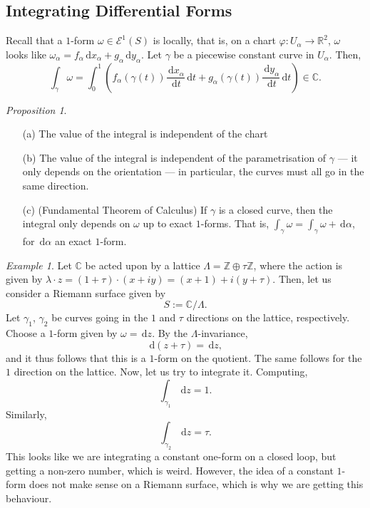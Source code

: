 \documentclass[a4paper]{report}
\theoremstyle{definition}
\theoremstyle{remark}
\theoremstyle{proposition}
\newtheorem{proposition}{Proposition}
\theoremstyle{conjecture}
\theoremstyle{lemma}
\theoremstyle{corollary}
\theoremstyle{exercise}
\theoremstyle{example}
\newtheorem{example}{Example}
\newcommand{\C}{\mathbb{C}}
\newcommand{\mcal}{\mathcal}
\newcommand{\diff}{\,\mathrm{d}}
\begin{document}
\subsection{Integrating Differential Forms}

Recall that  a $1$-form $\omega \in \mcal{E}^1(S)$ is locally, that is, 
on a chart $\varphi: U_\alpha \to \mathbb{R}^2$, $\omega$ looks like
$\omega_\alpha = f_\alpha\diff x_\alpha + g_\alpha \diff y_\alpha$.
Let $\gamma$ be a piecewise constant curve in $U_\alpha$. Then,
$$\int_\gamma \omega = \int_0^1 \left(f_\alpha(\gamma(t)) \frac{\diff x_\alpha}{\diff t}\diff t + g_\alpha(\gamma(t)) \frac{\diff y_\alpha}{\diff t}\diff t\right)\in \C.$$

\begin{proposition}
    \begin{itemize}
        \item[(a)] The value of the integral is independent of the chart
        \item[(b)] The value of the integral is independent of the 
            parametrisation of $\gamma$ --- it only depends on the orientation --- in particular, the curves must all go in the same direction.
        \item[(c)] (Fundamental Theorem of Calculus) 
            If $\gamma$ is a closed curve, then the integral only 
            depends on $\omega$ up to exact $1$-forms. That is, 
            $\int_\gamma \omega = \int_\gamma\omega +\diff \alpha$, for
            $\diff\alpha$ an exact $1$-form.
    \end{itemize}
\end{proposition}

\begin{example}
    Let $\C$ be acted upon by a lattice $\Lambda = \mathbb{Z}\oplus \tau\mathbb{Z}$, where the action is given by 
    $\lambda \cdot z = (1+\tau)\cdot (x+iy) = (x+1) + i(y+\tau)$.
    Then, let us consider a Riemann surface given by 
    $$S := \C/\Lambda.$$
    Let $\gamma_1$, $\gamma_2$ be curves going in the $1$ and $\tau$ 
    directions on the lattice, respectively. Choose a $1$-form given by 
    $\omega = \diff z$. By the $\Lambda$-invariance, 
    $$\diff (z+\tau) = \diff z,$$
    and it thus follows that this is a $1$-form on the quotient. The same 
    follows for the $1$ direction on the lattice. Now, let us try to integrate
    it. Computing, 
    $$\int_{\gamma_1} \diff z = 1.$$
    Similarly, 
    $$\int_{\gamma_2} \diff z = \tau.$$
    This looks like we are integrating a constant one-form on a closed loop, 
    but getting a non-zero number, which is weird. However, the idea 
    of a constant $1$-form does not make sense on a Riemann surface, which is 
    why we are getting this behaviour. 
\end{example}
\end{document}
